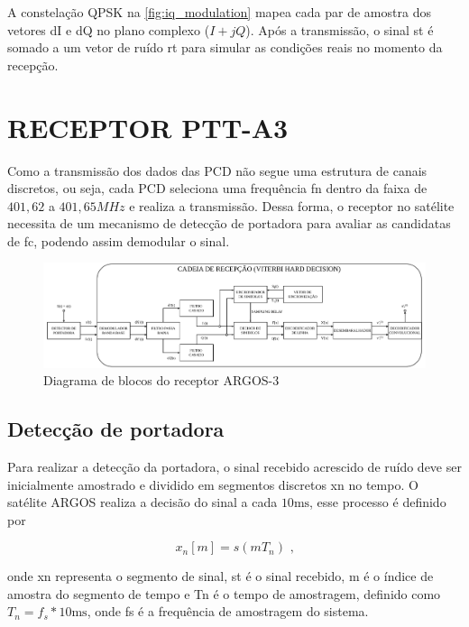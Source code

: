 A constelação \gls{QPSK} na \autoref{fig:iq_modulation} mapea cada par de amostra dos vetores \gls{dI} e \gls{dQ} no plano complexo ($I + jQ$). Após a transmissão, o sinal \gls{st} é somado a um vetor de ruído \gls{rt} para simular as condições reais no momento da recepção.

\section{RECEPTOR PTT-A3}\label{sec:receptor}

Como a transmissão dos dados das \gls{PCD} não segue uma estrutura de canais discretos, ou seja, cada \gls{PCD} seleciona uma frequência \gls{fn} dentro da faixa de $401,62$ a $401,65MHz$ e realiza a transmissão. Dessa forma, o receptor no satélite necessita de um mecanismo de detecção de portadora para avaliar as candidatas de \gls{fc}, podendo assim demodular o sinal.

\begin{figure}[H]
	\centering
	\caption{Diagrama de blocos do receptor ARGOS-3}\label{fig:diagrama_receptor}
	\includegraphics[width=\linewidth]{assets/cap2/receptor.pdf}
\end{figure}


\subsection{Detecção de portadora}

Para realizar a detecção da portadora, o sinal recebido acrescido de ruído deve ser inicialmente amostrado e dividido em segmentos discretos \gls{xn} no tempo. O satélite \gls{ARGOS} realiza a decisão do sinal a cada $10 \text{ms}$, esse processo é definido por 

\vspace{-0.4em}
\begin{equation}
    x_n[m] = s(mT_n) \text{ ,}
\end{equation}

\noindent onde \gls{xn} representa o segmento de sinal, \gls{st} é o sinal recebido, \gls{m} é o índice de amostra do segmento de tempo e \gls{Tn} é o tempo de amostragem, definido como $T_n = f_s * 10 \text{ms}$, onde \gls{fs} é a frequência de amostragem do sistema. 


